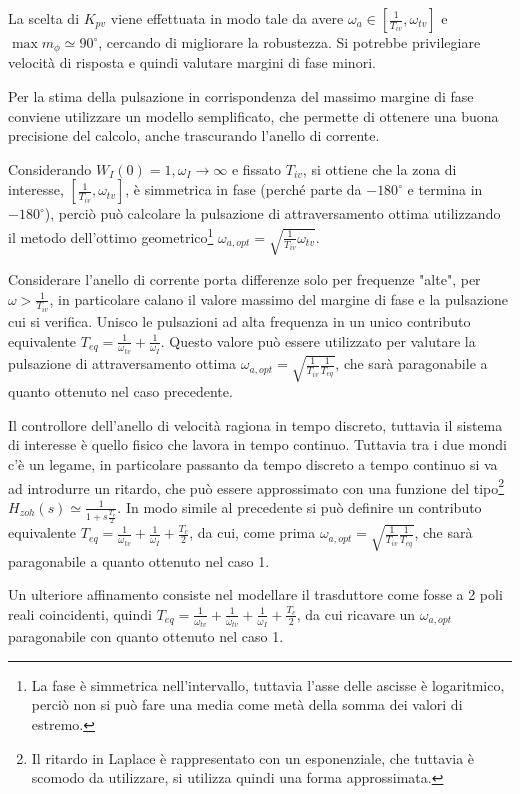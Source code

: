 La scelta di \(K_{pv}\) viene effettuata in modo tale da avere \(\omega_a \in \left[\frac{1}{T_{iv}}, \omega_{tv}\right]\) e \(\max{m_\phi} \simeq 90^\circ\), cercando di migliorare la robustezza. Si potrebbe privilegiare velocità di risposta e quindi valutare margini di fase minori.

Per la stima della pulsazione in corrispondenza del massimo margine di fase conviene utilizzare un modello semplificato, che permette di ottenere una buona precisione del calcolo, anche trascurando l'anello di corrente.

Considerando \(W_I(0)=1, \omega_I\rightarrow \infty\) e fissato \(T_{iv}\), si ottiene che la zona di interesse, \(\left[\frac{1}{T_{iv}}, \omega_{tv}\right]\), è simmetrica in fase (perché parte da \(-180^\circ\) e termina in \(-180^\circ\)),  perciò può calcolare la pulsazione di attraversamento ottima utilizzando il metodo dell'ottimo geometrico\footnote{La fase è simmetrica nell'intervallo, tuttavia l'asse delle ascisse è logaritmico, perciò non si può fare una media come metà della somma dei valori di estremo.} \(\omega_{a,opt} = \sqrt{\frac{1}{T_{iv}}\omega_{tv}}\).

Considerare l'anello di corrente porta differenze solo per frequenze "alte", per \(\omega>\frac{1}{T_{iv}}\), in particolare calano il valore massimo del margine di fase e la pulsazione cui si verifica. Unisco le pulsazioni ad alta frequenza in un unico contributo equivalente \(T_{eq}=\frac{1}{\omega_{tv}}+\frac{1}{\omega_I}\). Questo valore può essere utilizzato per valutare la pulsazione di attraversamento ottima \(\omega_{a,opt} = \sqrt{\frac{1}{T_{iv}}\frac{1}{T_{eq}}}\), che sarà paragonabile a quanto ottenuto nel caso precedente.

Il controllore dell'anello di velocità ragiona in tempo discreto, tuttavia il sistema di interesse è quello fisico che lavora in tempo continuo. Tuttavia tra i due mondi c'è un legame, in particolare passanto da tempo discreto a tempo continuo si va ad introdurre un ritardo, che può essere approssimato con una funzione del tipo\footnote{Il ritardo in Laplace è rappresentato con un esponenziale, che tuttavia è scomodo da utilizzare, si utilizza quindi una forma approssimata.} \(H_{zoh}(s) \simeq \frac{1}{1+s\frac{T_c}{2}}\). In modo simile al precedente si può definire un contributo equivalente \(T_{eq}=\frac{1}{\omega_{tv}}+\frac{1}{\omega_I}+\frac{T_c}{2}\), da cui, come prima \(\omega_{a,opt} = \sqrt{\frac{1}{T_{iv}}\frac{1}{T_{eq}}}\), che sarà paragonabile a quanto ottenuto nel caso 1.

Un ulteriore affinamento consiste nel modellare il trasduttore come fosse a 2 poli reali coincidenti, quindi \(T_{eq}=\frac{1}{\omega_{tv}}+\frac{1}{\omega_{tv}}+\frac{1}{\omega_I}+\frac{T_c}{2}\), da cui ricavare un \(\omega_{a,opt}\) paragonabile con quanto ottenuto nel caso 1.

